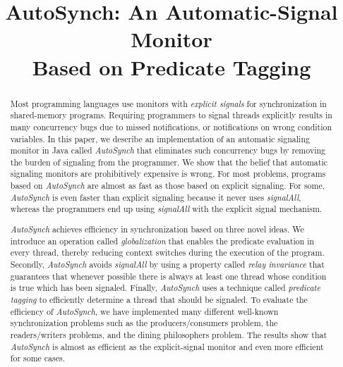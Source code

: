 \documentclass[preprint]{sigplanconf}
\begin{document}
\copyrightdata{[to be supplied]} 


\title{AutoSynch: An Automatic-Signal Monitor \\ Based on Predicate Tagging}
\subtitle{}

\authorinfo{}{}

\maketitle
\begin{abstract}
Most programming languages use monitors with {\em explicit signals}
for synchronization in shared-memory programs. Requiring programmers to signal
threads explicitly results in many concurrency bugs due to missed notifications, or
notifications on wrong condition variables.
In this paper, we describe an implementation of an automatic signaling monitor in Java
called {\em AutoSynch} that eliminates such concurrency bugs by 
removing the burden of signaling from the programmer. We show that the
belief that automatic signaling monitors are prohibitively expensive is wrong.
For most problems, programs based on {\em AutoSynch} are almost as fast as 
those based on explicit signaling. For some, {\em AutoSynch} is even faster than
explicit signaling because it never uses {\em signalAll}, whereas the programmers
end up using {\em signalAll} with the explicit signal mechanism.

{\em AutoSynch} achieves efficiency in synchronization based on three novel ideas.
We introduce an operation called
{\em globalization} that enables the predicate evaluation in
every thread, thereby reducing context switches during the execution of the program. 
Secondly, {\em AutoSynch} avoids {\em signalAll} by using a property called {\em relay invariance}
that guarantees that whenever possible there is always at least one thread whose condition is true which has been 
signaled.
Finally, {\em AutoSynch} uses a technique called {\em predicate tagging} to efficiently
determine a thread that should be signaled.
To evaluate the efficiency of {\em AutoSynch}, we have implemented many different 
well-known synchronization problems such as the producers/consumers problem,
the readers/writers problems, and the dining philosophers problem. The results
show that {\em AutoSynch} is almost as efficient as the explicit-signal monitor
and even more efficient for some cases. 

\end{abstract}
\end{document}
